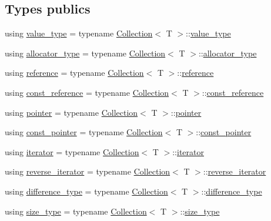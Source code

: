 \subsection*{Types publics}
\begin{DoxyCompactItemize}
\item 
using \hyperlink{class_collection_pool_a018a408f2c2bcdf2b542141dbc1d1c17}{value\+\_\+type} = typename \hyperlink{class_collection}{Collection}$<$ T $>$\+::\hyperlink{class_collection_pool_a018a408f2c2bcdf2b542141dbc1d1c17}{value\+\_\+type}
\item 
using \hyperlink{class_collection_pool_a2334b5af86ff5008ec9ad1ff2ea17e19}{allocator\+\_\+type} = typename \hyperlink{class_collection}{Collection}$<$ T $>$\+::\hyperlink{class_collection_ac7974b0b552f0a94065aadc48ae53397}{allocator\+\_\+type}
\item 
using \hyperlink{class_collection_pool_a12dd127db0342d4b694d857f6c77ad90}{reference} = typename \hyperlink{class_collection}{Collection}$<$ T $>$\+::\hyperlink{class_collection_abbc291771b11c48cd2f297a0d9fe0449}{reference}
\item 
using \hyperlink{class_collection_pool_a1861ca0a8e40abe5f8d27ec35fbc439d}{const\+\_\+reference} = typename \hyperlink{class_collection}{Collection}$<$ T $>$\+::\hyperlink{class_collection_abb8c0f6de5e322aa531837aab7358b89}{const\+\_\+reference}
\item 
using \hyperlink{class_collection_pool_a3bfec6c487a93170866fde4b57a85b21}{pointer} = typename \hyperlink{class_collection}{Collection}$<$ T $>$\+::\hyperlink{class_collection_a9a5b5d9b389c113364d527900c745efb}{pointer}
\item 
using \hyperlink{class_collection_pool_ae1a6ed261a58f72a07c40a2cc98325d2}{const\+\_\+pointer} = typename \hyperlink{class_collection}{Collection}$<$ T $>$\+::\hyperlink{class_collection_a79ea96d1fa145e340e907547d0053b81}{const\+\_\+pointer}
\item 
using \hyperlink{class_collection_pool_a7beafeb93ccc043bcde933faab05718f}{iterator} = typename \hyperlink{class_collection}{Collection}$<$ T $>$\+::\hyperlink{class_collection_a317dca4fdf1eb2e47643bb60c620f802}{iterator}
\item 
using \hyperlink{class_collection_pool_a02f041d9c0562d656eaa05a9859780af}{reverse\+\_\+iterator} = typename \hyperlink{class_collection}{Collection}$<$ T $>$\+::\hyperlink{class_collection_ac3805407b2dc537e71db7af070b8d8a6}{reverse\+\_\+iterator}
\item 
using \hyperlink{class_collection_pool_a5e8db21ac58139c891fee4ae87295744}{difference\+\_\+type} = typename \hyperlink{class_collection}{Collection}$<$ T $>$\+::\hyperlink{class_collection_a60b36ef7aba0a88dff0e98fc2adb98a8}{difference\+\_\+type}
\item 
using \hyperlink{class_collection_pool_a3fe4d4cbb79a3cb138cdb3f07c401b00}{size\+\_\+type} = typename \hyperlink{class_collection}{Collection}$<$ T $>$\+::\hyperlink{class_collection_a3f8b024f587aa20be530866da30948c4}{size\+\_\+type}
\end{DoxyCompactItemize}
